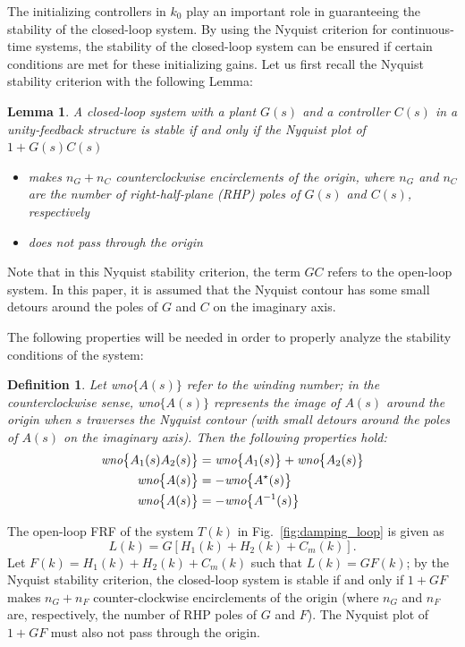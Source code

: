 \documentclass[a4paper, 10pt, conference]{ieeeconf}
\newtheorem{lemma}{Lemma}
\newtheorem{definition}{Definition}
\begin{document}
The initializing controllers in $k_0$ play an important role in guaranteeing the stability of the closed-loop system. By using the Nyquist criterion for continuous-time systems, the stability of the closed-loop system can be ensured if certain conditions are met for these initializing gains. Let us first recall the Nyquist stability criterion with the following Lemma:
\begin{lemma}
A closed-loop system with a plant $G(s)$ and a controller $C(s)$ in a unity-feedback structure is stable if and only if the Nyquist plot of $1+G(s)C(s)$
\begin{itemize}
\item makes $n_G + n_C$ counterclockwise encirclements of the origin, where $n_G$ and $n_C$ are the number of right-half-plane (RHP) poles of $G(s)$ and $C(s)$, respectively
\item does not pass through the origin
\end{itemize}
\end{lemma}
Note that in this Nyquist stability criterion, the term $GC$ refers to the open-loop system. In this paper, it is assumed that the Nyquist contour has some small detours around the poles of $G$ and $C$ on the imaginary axis.

The following properties will be needed in order to properly analyze the stability conditions of the system:
\begin{definition}
Let \emph{wno}$\{ A(s)\}$ refer to the winding number; in the counterclockwise sense, \emph{wno}$\{ A(s)\}$ represents the image of $A(s)$ around the origin when $s$ traverses the Nyquist contour (with small detours around the poles of $A(s)$ on the imaginary axis). Then the following properties hold:
\begin{align}
\emph{wno}\bigl\{ A_1(s)A_2(s) \bigr\} &= \emph{wno}\bigl\{ A_1(s) \bigr\} + \emph{wno}\bigl\{ A_2(s) \bigr\}  \label{eq:wno_add}\\ 
\emph{wno}\bigl\{ A(s)\bigr\} &= -\emph{wno}\bigl\{ A^{\star}(s)\bigr\} \label{eq:wno_conj} \\ 
\emph{wno}\bigl\{ A(s)\bigr\} &= -\emph{wno}\bigl\{ A^{-1}(s)\bigr\} \label{eq:wno_inv}
\end{align}
\end{definition}

The open-loop FRF of the system $T(k)$ in Fig.~\ref{fig:damping_loop} is given as $$L(k) = G[H_1(k)+H_2(k)+C_m(k)].$$ Let $F(k) = H_1(k)+H_2(k)+C_m(k)$ such that $L(k) = GF(k)$; by the Nyquist stability criterion, the closed-loop system is stable if and only if $1+GF$ makes $n_{G}+n_F$ counter-clockwise encirclements of the origin (where $n_{G}$ and $n_F$ are, respectively, the number of RHP poles of $G$ and $F$). The Nyquist plot of $1+GF$ must also not pass through the origin.
\end{document}

